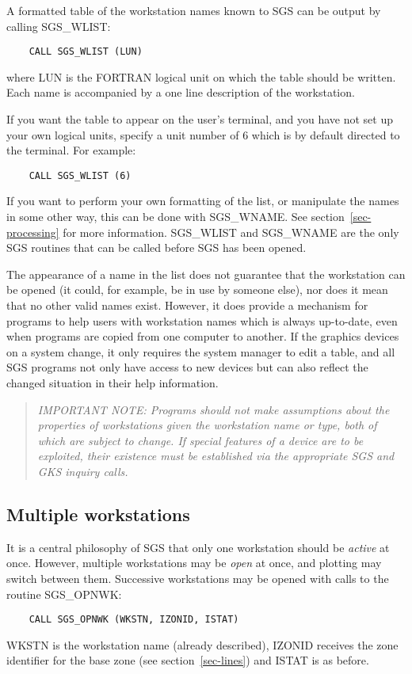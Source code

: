A formatted table of the workstation names known to SGS can be output by
calling SGS\_WLIST: 
\begin{verbatim}
    CALL SGS_WLIST (LUN) 
\end{verbatim}
where LUN is the FORTRAN logical unit on which the table should be written.
Each name is accompanied by a one line description of the workstation.

If you want the table to appear on the user's terminal, and you have not set up
your own logical units, specify a unit number of 6 which is by default directed
to the terminal.
For example:
\begin{verbatim}
    CALL SGS_WLIST (6)
\end{verbatim}
If you want to perform your own formatting of the list, or manipulate the names
in some other way, this can be done with SGS\_WNAME.
See section~\ref{sec-processing} for more information.
SGS\_WLIST and SGS\_WNAME are the only SGS routines that can be called before
SGS has been opened.

The appearance of a name in the list does not guarantee that the workstation can
be opened (it could, for example, be in use by someone else), nor does it mean
that no other valid names exist.
However, it does provide a mechanism for programs to help users with
workstation names which is always up-to-date, even when programs are copied
from one computer to another.
If the graphics devices on a system change, it only requires the system manager
to edit a table, and all SGS programs not only have access to new
devices but can also reflect the changed situation in their help information.

\begin{quote}
{\em IMPORTANT NOTE: Programs should not make assumptions about the properties
of workstations given the workstation name or type, both of which are subject
to change.  If special features of a device are to be exploited, their 
existence must be established via the appropriate SGS and GKS inquiry calls.}
\end{quote}

\subsection {Multiple workstations}\label{sec-mult-ws}

It is a central philosophy of SGS that only one workstation should be
{\em active} at once.
However, multiple workstations may be {\em open} at once, and plotting may
switch between them.
Successive workstations may be opened with calls to the routine SGS\_OPNWK:
\begin{verbatim}
    CALL SGS_OPNWK (WKSTN, IZONID, ISTAT)
\end{verbatim}
WKSTN is the workstation name (already described), IZONID receives the zone
identifier for the base zone (see section~\ref{sec-lines}) and ISTAT is as before.


